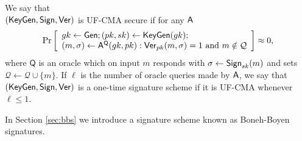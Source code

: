 \begin{definition}
We say that\\ $(\mathsf{KeyGen},\mathsf{Sign}, \mathsf{Ver})$ is UF-CMA secure if for any $\mathsf{A}$
$$
\Pr\left[\begin{array}{l}
gk\gets\mathsf{Gen};(pk,sk)\gets\mathsf{KeyGen}(gk);\\
(m,\sigma)\gets\mathsf{A}^{\mathsf{Q}}(gk,pk): \mathsf{Ver}_{pk}(m,\sigma)=1\text{ and } m\notin\mathcal{Q}
\end{array}\right]\approx 0,
$$
where $\mathsf{Q}$ is an oracle which on input $m$ responds with $\sigma\gets\mathsf{Sign}_{sk}(m)$ and sets $\mathcal{Q}\gets\mathcal{Q}\cup\{m\}$. If $\ell$ is the number of oracle queries made by $\mathsf{A}$, we say that $(\mathsf{KeyGen},\mathsf{Sign},\mathsf{Ver})$ is a one-time signature scheme if it is UF-CMA whenever $\ell\leq 1$.
\end{definition}

In Section \ref{sec:bbs} we introduce a signature scheme known as Boneh-Boyen signatures.
